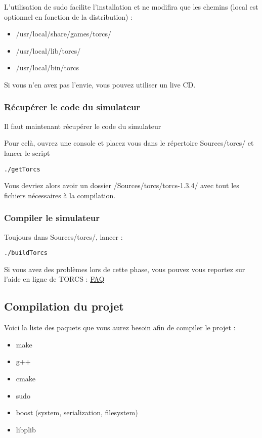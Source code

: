 \documentclass[a4paper,12pt]{article}
\begin{document}
  
  L'utilisation de sudo facilite l'installation et ne modifira que les chemins (local est optionnel en fonction de la
  distribution) : 
  \begin{itemize}
    \item /usr/local/share/games/torcs/
    \item /usr/local/lib/torcs/
    \item /usr/local/bin/torcs
  \end{itemize}

  Si vous n'en avez pas l'envie, vous pouvez utiliser un live CD.
  
  \subsubsection{Récupérer le code du simulateur}
  
  
  Il faut maintenant récupérer le code du simulateur 
  
  Pour celà, ouvrez une console et placez vous dans le répertoire Sources/torcs/ et lancer le script 
    \begin{lstlisting}
./getTorcs
    \end{lstlisting}
  Vous devriez alors avoir un dossier /Sources/torcs/torcs-1.3.4/ avec tout les fichiers nécessaires à la compilation.
 
   \subsubsection{Compiler le simulateur}
  
  Toujours dans Sources/torcs/, lancer :
  
  \begin{lstlisting}
./buildTorcs
    \end{lstlisting}
  
  Si vous avez des problèmes lors de cette phase, vous pouvez vous reportez sur l'aide en ligne de TORCS :
  \href{http://torcs.sourceforge.net/index.php?name=Sections&op=viewarticle&artid=30}{FAQ}
  
  \subsection{Compilation du projet}
  
  Voici la liste des paquets que vous aurez besoin afin de compiler le projet :
    
   \begin{multicols}{2}
  \begin{itemize}
    \item make
    \item g++
    \item cmake
    \item sudo
    \item boost (system, serialization, filesystem)
    \item libplib
  \end{itemize}
    \end{multicols}
\end{document}
